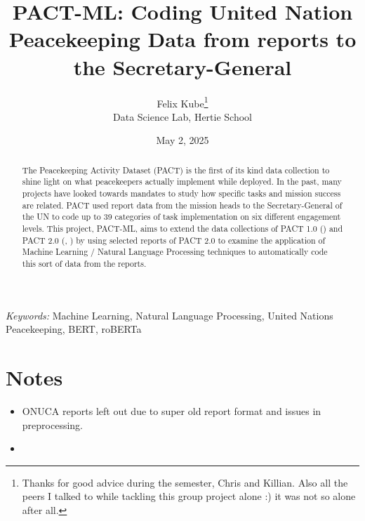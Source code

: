 \documentclass[
  12pt]{article}
\providecommand{\tightlist}{%
  \setlength{\itemsep}{0pt}\setlength{\parskip}{0pt}}\usepackage{longtable,booktabs,array}
\begin{document}
\def\spacingset#1{\renewcommand{\baselinestretch}%
{#1}\small\normalsize} \spacingset{1}



\date{May 2, 2025}
\title{\bf PACT-ML: Coding United Nation Peacekeeping Data from reports
to the Secretary-General}
\author{
Felix Kube\thanks{Thanks for good advice during the semester, Chris and
Killian. Also all the peers I talked to while tackling this group
project alone :) it was not so alone after all.}\\
Data Science Lab, Hertie School\\
}
\maketitle

\bigskip
\bigskip
\begin{abstract}
The Peacekeeping Activity Dataset (PACT) is the first of its kind data
collection to shine light on what peacekeepers actually implement while
deployed. In the past, many projects have looked towards mandates to
study how specific tasks and mission success are related. PACT used
report data from the mission heads to the Secretary-General of the UN to
code up to 39 categories of task implementation on six different
engagement levels. This project, PACT-ML, aims to extend the data
collections of PACT 1.0 (\citet{Blair2022}) and PACT 2.0 (\citet{PACT2},
\citet{Otto2024}) by using selected reports of PACT 2.0 to examine the
application of Machine Learning / Natural Language Processing techniques
to automatically code this sort of data from the reports.
\end{abstract}

\noindent%
{\it Keywords:} Machine Learning, Natural Language Processing, United
Nations Peacekeeping, BERT, roBERTa
\vfill

\newpage
\spacingset{1.9} %

\section{Notes}\label{notes}

\begin{itemize}
\tightlist
\item
  ONUCA reports left out due to super old report format and issues in
  preprocessing.
\item
\end{itemize}
\end{document}
